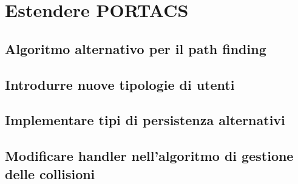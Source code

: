 \section{Estendere PORTACS}


\subsection{Algoritmo alternativo per il path finding}


\subsection{Introdurre nuove tipologie di utenti}


\subsection{Implementare tipi di persistenza alternativi}


\subsection{Modificare handler nell'algoritmo di gestione delle collisioni}


